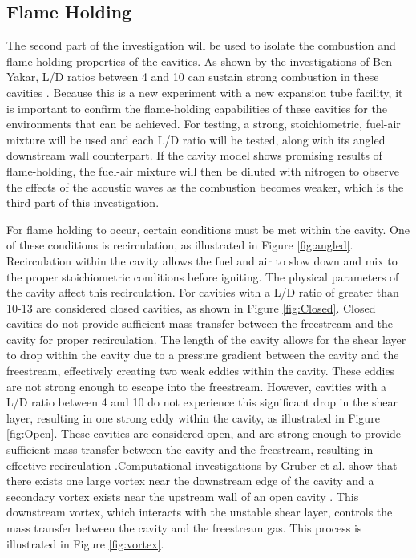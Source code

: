 
\subsection{Flame Holding}

The second part of the investigation will be used to isolate the combustion and flame-holding properties of the cavities. As shown by the investigations of Ben-Yakar, L/D ratios between 4 and 10 can sustain strong combustion in these cavities \cite{ben2001cavity}. Because this is a new experiment with a new expansion tube facility, it is important to confirm the flame-holding capabilities of these cavities for the environments that can be achieved. For testing, a strong, stoichiometric, fuel-air mixture will be used and each L/D ratio will be tested, along with its angled downstream wall counterpart. If the cavity model shows promising results of flame-holding, the fuel-air mixture will then be diluted with nitrogen to observe the effects of the acoustic waves as the combustion becomes weaker, which is the third part of this investigation. 

For flame holding to occur, certain conditions must be met within the cavity. One of these conditions is recirculation, as illustrated in Figure \ref{fig:angled}. Recirculation within the cavity allows the fuel and air to slow down and mix to the proper stoichiometric conditions before igniting. The physical parameters of the cavity affect this recirculation. For cavities with a L/D ratio of greater than 10-13 are considered closed cavities, as shown in Figure \ref{fig:Closed}. Closed cavities do not provide sufficient mass transfer between the freestream and the cavity for proper recirculation. The length of the cavity allows for the shear layer to drop within the cavity due to a pressure gradient between the cavity and the freestream, effectively creating two weak eddies within the cavity. These eddies are not strong enough to escape into the freestream. However, cavities with a L/D ratio between 4 and 10 do not experience this significant drop in the shear layer, resulting in one strong eddy within the cavity, as illustrated in Figure \ref{fig:Open}. These cavities are considered open, and are strong enough to provide sufficient mass transfer between the cavity and the freestream, resulting in effective recirculation \cite{ben2000experimental}.Computational investigations by Gruber et al. show that there exists one large vortex near the downstream edge of the cavity and a secondary vortex exists near the upstream wall of an open cavity \cite{gruber2001fundamental}. This downstream vortex, which interacts with the unstable shear layer, controls the mass transfer between the cavity and the freestream gas. This process is illustrated in Figure \ref{fig:vortex}. 

